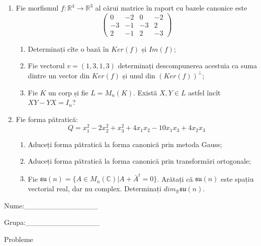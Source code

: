 \documentclass{article}
\begin{document}
\begin{enumerate}
 \item Fie morfismul $f:\mathbb{R}^4 \to \mathbb{R}^3$ al cărui matrice în raport cu bazele canonice este
$$\begin{pmatrix}
0&-2&0&-2\\
-3&-1&-3&2\\
2&-1&2&-3
\end{pmatrix}$$

\begin{enumerate}
\item Determinați cîte o bază în $Ker(f)$ și $Im(f)$;
\item Fie vectorul $v=(1,3,1,3)$ determinați descompunerea acestuia ca suma dintre un vector din $Ker(f)$ și unul din $(Ker(f))^\perp$;
\item Fie $K$ un corp și fie $L=M_n(K)$. Există $X,Y \in L$ astfel încît $XY-YX=I_n$?  
\end{enumerate}
\item Fie forma pătratică:
$$Q= x_1^2-2x_2^2+x_3^2+4x_1x_2-10x_1x_3+4x_2x_3$$

\begin{enumerate}
\item Aduceți forma pătratică la forma canonică prin metoda Gauss;
\item Aduceți forma pătratică la forma canonică prin transformări ortogonale;
\item Fie $\mathfrak{su}(n)=\{ A \in M_n(\mathbb{C}) | A+\bar{A}^t=0\}$. Arătați că $\mathfrak{su}(n)$ este spațiu vectorial real, dar nu complex.
Determinați $dim_{\mathbb{R}}\mathfrak{su}(n)$.
\end{enumerate}
\end{enumerate}
\newpage
\begin{flushright}
Nume:\_\_\_\_\_\_\_\_\_\_\_\_\_\_
 
 
Grupa:\_\_\_\_\_\_\_\_\_\_\_\_\_\_
\end{flushright}
\begin{center}
\vspace{2cm}
{\Large Probleme}
\vspace{2cm}
\end{center}
\end{document}
